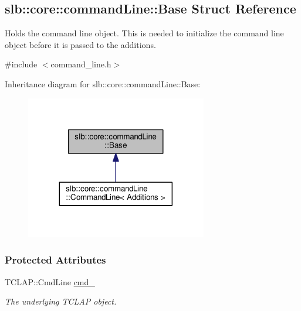 \hypertarget{structslb_1_1core_1_1commandLine_1_1Base}{}\subsection{slb\+:\+:core\+:\+:command\+Line\+:\+:Base Struct Reference}
\label{structslb_1_1core_1_1commandLine_1_1Base}


Holds the command line object. This is needed to initialize the command line object before it is passed to the additions.  




{\ttfamily \#include $<$command\+\_\+line.\+h$>$}



Inheritance diagram for slb\+:\+:core\+:\+:command\+Line\+:\+:Base\+:\nopagebreak
\begin{figure}[H]
\begin{center}
\leavevmode
\includegraphics[width=224pt]{structslb_1_1core_1_1commandLine_1_1Base__inherit__graph}
\end{center}
\end{figure}
\subsubsection*{Protected Attributes}
\begin{DoxyCompactItemize}
\item 
T\+C\+L\+A\+P\+::\+Cmd\+Line \hyperlink{structslb_1_1core_1_1commandLine_1_1Base_ac678e3e41ffdfa18846c9fee1c69fdfc}{cmd\+\_\+}\hypertarget{structslb_1_1core_1_1commandLine_1_1Base_ac678e3e41ffdfa18846c9fee1c69fdfc}{}\label{structslb_1_1core_1_1commandLine_1_1Base_ac678e3e41ffdfa18846c9fee1c69fdfc}

\begin{DoxyCompactList}\small\item\em The underlying T\+C\+L\+AP object. \end{DoxyCompactList}\end{DoxyCompactItemize}


